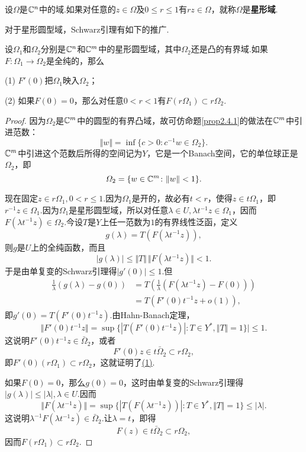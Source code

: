 \begin{definition}\label{def2.4.2}
	设$\Omega$是$\mathbb C^n$中的域.如果对任意的$z\in\Omega$及$0\le r\le1$有$rz\in\Omega$，就称$\Omega$是\textbf{星形域}.
\end{definition}
对于星形圆型域，Schwarz引理有如下的推广.
\begin{theorem}\label{thm2.4.3}
	设$\Omega_1$和$\Omega_2$分别是$\mathbb C^n$和$\mathbb C^m$中的星形圆型域，其中$\Omega_2$还是凸的有界域.如果$F\colon\Omega_1\to\Omega_2$是全纯的，那么
	
	(1)\hypertarget{2.4.3}{}
	$F'(0)$把$\Omega_1$映入$\Omega_2$；
	
	(2)\hypertarget{2.4.3}{}
	如果$F(0)=0$，那么对任意$0<r<1$有$F(r\Omega_1)\subset r\Omega_2$.
\end{theorem}
\begin{proof}
	因为$\Omega_2$是$\mathbb C^m$中的圆型的有界凸域，故可仿命题\ref{prop2.4.1}的做法在$\mathbb C^m$中引进范数：
	\[\Vert w\Vert=\inf\{c>0\colon c^{-1}w\in\Omega_2\}.\]
	$\mathbb C^m$中引进这个范数后所得的空间记为$Y$，它是一个Banach空间，它的单位球正是$\Omega_2$，即
	\[\varOmega_2=\{w\in\mathbb C^m\colon\Vert w\Vert<1\}.\]
	
	现在固定$z\in r\Omega_1,0<r\le 1$.因为$\Omega_1$是开的，故必有$t<r$，使得$z\in t\Omega_1$，即$r^{-1}z\in\Omega_1$.因为$\Omega_1$是星形圆型域，所以对任意$\lambda\in U,\lambda t^{-1}z\in\Omega_1$，因而$F(\lambda t^{-1}z)\in\Omega_2$.今设$T$是$Y$上任一范数为$1$的有界线性泛函，定义
	\[g(\lambda)=T(F(\lambda t^{-1}z)),\]
	则$g$是$U$上的全纯函数，而且
	\[|g(\lambda)|\le\Vert T\Vert\,\Vert F(\lambda t^{-1}z)\Vert<1.\]
	于是由单复变的Schwarz引理得$|g'(0)|\le1$.但
	\begin{align*}
		\frac1{\lambda}(g(\lambda)-g(0))
		&=T\left(\frac1{\lambda}(F(\lambda t^{-1}z)-F(0))\right)\\
		&=T(F'(0)t^{-1}z+o(1)),
	\end{align*}
即$g'(0)=T(F'(0)t^{-1}z)$.由Hahn-Banach定理，
\[\Vert F'(0)t^{-1}z\Vert=\sup\{|T(F'(0)t^{-1}z)|\colon T\in Y^\ast,\Vert T\Vert=1\}|\le1.\]
这说明$F'(0)t^{-1}z\in\bar{\Omega}_2$，或者
\[F'(0)z\in t\bar{\Omega}_2\subset r\Omega_2,\]
即$F'(0)(r\Omega_1)\subset r\Omega_2$，这就证明了\hyperlink{2.4.3}{(1)}.

如果$F(0)=0$，那么$g(0)=0$，这时由单复变的Schwarz引理得$|g(\lambda)|\le |\lambda|,\lambda\in U$.因而
\[\Vert F(\lambda t^{-1}z)\Vert=\sup\{ |T(F(\lambda t^{-1}z))|\colon T\in Y^\ast,\Vert T\Vert=1\}\le|\lambda|.\]
这说明$\lambda^{-1}F(\lambda t^{-1}z)\in\bar{\Omega}_2$.让$\lambda=t$，即得
\[F(z)\in t\bar{\Omega}_2\subset r\Omega_2,\]
因而$F(r\Omega_1)\subset r\Omega_2$.
	\end{proof}
